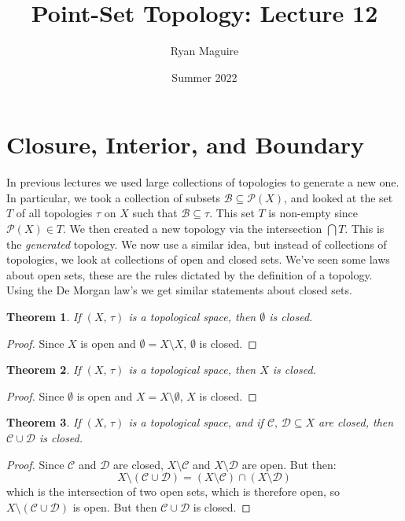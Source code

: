 \documentclass{article}
\title{Point-Set Topology: Lecture 12}
\author{Ryan Maguire}
\date{Summer 2022}
\theoremstyle{plain}
\newtheorem{theorem}{Theorem}[section]
\theoremstyle{normal}
\begin{document}
    \maketitle
    \section{Closure, Interior, and Boundary}
        In previous lectures we used large collections of topologies to
        generate a new one. In particular, we took a collection
        of subsets $\mathcal{B}\subseteq\mathcal{P}(X)$, and looked at the
        set $T$ of all topologies $\tau$ on $X$ such that
        $\mathcal{B}\subseteq\tau$. This set $T$ is non-empty since
        $\mathcal{P}(X)\in{T}$. We then created a new topology via the
        intersection $\bigcap{T}$. This is the \textit{generated} topology.
        We now use a similar idea, but instead of collections of topologies,
        we look at collections of open and closed sets. We've seen some laws
        about open sets, these are the rules dictated by the definition of a
        topology. Using the De Morgan law's we get similar statements about
        closed sets.
        \begin{theorem}
            If $(X,\,\tau)$ is a topological space, then $\emptyset$ is closed.
        \end{theorem}
        \begin{proof}
            Since $X$ is open and $\emptyset=X\setminus{X}$, $\emptyset$ is
            closed.
        \end{proof}
        \begin{theorem}
            If $(X,\,\tau)$ is a topological space, then $X$ is closed.
        \end{theorem}
        \begin{proof}
            Since $\emptyset$ is open and $X=X\setminus\emptyset$, $X$ is
            closed.
        \end{proof}
        \begin{theorem}
            If $(X,\,\tau)$ is a topological space, and if
            $\mathcal{C},\,\mathcal{D}\subseteq{X}$ are closed, then
            $\mathcal{C}\cup\mathcal{D}$ is closed.
        \end{theorem}
        \begin{proof}
            Since $\mathcal{C}$ and $\mathcal{D}$ are closed,
            $X\setminus\mathcal{C}$ and $X\setminus\mathcal{D}$ are open.
            But then:
            \begin{equation}
                X\setminus(\mathcal{C}\cup\mathcal{D})
                =(X\setminus\mathcal{C})\cap(X\setminus\mathcal{D})
            \end{equation}
            which is the intersection of two open sets, which is therefore open,
            so $X\setminus(\mathcal{C}\cup\mathcal{D})$ is open. But then
            $\mathcal{C}\cup\mathcal{D}$ is closed.
        \end{proof}
\end{document}
